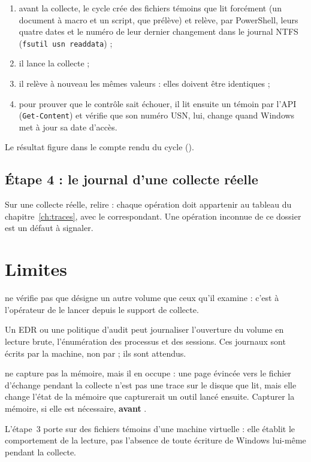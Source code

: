 \documentclass[11pt,a4paper,oneside]{report}
\begin{document}
\begin{enumerate}
  \item avant la collecte, le cycle crée des fichiers témoins que \wac{} lit
        forcément (un document à macro et un script, que 
        prélève) et relève, par PowerShell, leurs quatre dates et le numéro
        de leur dernier changement dans le journal NTFS
        (\texttt{fsutil usn readdata}) ;
  \item il lance la collecte ;
  \item il relève à nouveau les mêmes valeurs : elles doivent être identiques ;
  \item pour prouver que le contrôle sait échouer, il lit ensuite un témoin
        par l'API (\texttt{Get-Content}) et vérifie que son numéro USN, lui,
        change quand Windows met à jour sa date d'accès.
\end{enumerate}

Le résultat figure dans le compte rendu du cycle ().

\section{Étape 4 : le journal d'une collecte réelle}

Sur une collecte réelle, relire  : chaque
opération doit appartenir au tableau du chapitre~\ref{ch:traces}, avec le
 correspondant. Une opération inconnue de ce dossier est un
défaut à signaler.

\chapter{Limites}

\begin{description}[style=nextline,leftmargin=1.2em]
  \item[Dossier de sortie] \wac{} ne vérifie pas que  désigne un
        autre volume que ceux qu'il examine : c'est à l'opérateur de le lancer
        depuis le support de collecte.
  \item[Surveillance] Un EDR ou une politique d'audit peut journaliser
        l'ouverture du volume en lecture brute, l'énumération des processus et
        des sessions. Ces journaux sont écrits par la machine, non par \wac{} ;
        ils sont attendus.
  \item[Mémoire] \wac{} ne capture pas la mémoire, mais il en occupe : une
        page évincée vers le fichier d'échange pendant la collecte n'est pas
        une trace sur le disque que \wac{} lit, mais elle change l'état de la
        mémoire que capturerait un outil lancé ensuite. Capturer la mémoire,
        si elle est nécessaire, \textbf{avant} \wac{}.
  \item[Mesure] L'étape~3 porte sur des fichiers témoins d'une machine
        virtuelle : elle établit le comportement de la lecture, pas l'absence
        de toute écriture de Windows lui-même pendant la collecte.
\end{description}
\end{document}
